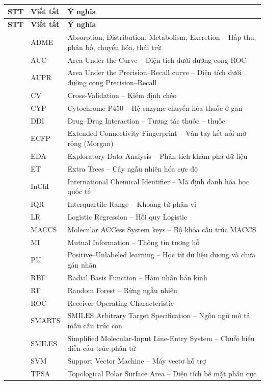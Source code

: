 \documentclass[12pt,a4paper,oneside]{report}
\begin{document}
\begin{xltabular}{\textwidth}{|>{\centering\arraybackslash}p{1cm}|p{2.6cm}|X|}
  \hline
  \textbf{STT} & \textbf{Viết tắt} & \textbf{Ý nghĩa} \\ \hline
\endfirsthead
  \hline
  \textbf{STT} & \textbf{Viết tắt} & \textbf{Ý nghĩa} \\ \hline
{} & ADME & Absorption, Distribution, Metabolism, Excretion -- Hấp thu, phân bố, chuyển hóa, thải trừ \\  & AUC & Area Under the Curve -- Diện tích dưới đường cong ROC \\  & AUPR & Area Under the Precision--Recall curve -- Diện tích dưới đường cong Precision--Recall \\  & CV & Cross-Validation -- Kiểm định chéo \\  & CYP & Cytochrome P450 -- Hệ enzyme chuyển hóa thuốc ở gan \\  & DDI & Drug--Drug Interaction -- Tương tác thuốc -- thuốc \\  & ECFP & Extended-Connectivity Fingerprint -- Vân tay kết nối mở rộng (Morgan) \\  & EDA & Exploratory Data Analysis -- Phân tích khám phá dữ liệu \\  & ET & Extra Trees -- Cây ngẫu nhiên hóa cực độ \\  & InChI & International Chemical Identifier -- Mã định danh hóa học quốc tế \\  & IQR & Interquartile Range -- Khoảng tứ phân vị \\  & LR & Logistic Regression -- Hồi quy Logistic \\  & MACCS & Molecular ACCess System keys -- Bộ khóa cấu trúc MACCS \\  & MI & Mutual Information -- Thông tin tương hỗ \\  & PU & Positive--Unlabeled learning -- Học từ dữ liệu dương và chưa gán nhãn \\  & RBF & Radial Basis Function -- Hàm nhân bán kính \\  & RF & Random Forest -- Rừng ngẫu nhiên \\  & ROC & Receiver Operating Characteristic \\  & SMARTS & SMILES Arbitrary Target Specification -- Ngôn ngữ mô tả mẫu cấu trúc con \\  & SMILES & Simplified Molecular-Input Line-Entry System -- Chuỗi biểu diễn cấu trúc phân tử \\  & SVM & Support Vector Machine -- Máy vectơ hỗ trợ \\  & TPSA & Topological Polar Surface Area -- Diện tích bề mặt phân cực \\ \hline
\end{xltabular}
\end{document}
